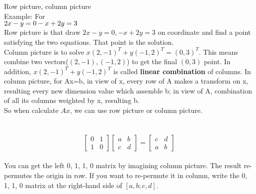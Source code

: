 \documentclass{article}
\begin{document}
\begin{spacing}{1.5}


\section{}
Row picture, column picture\\
Example: For\\
	$2x-y=0\\
	-x+2y=3$ \\
Row picture is that draw $2x-y=0, -x+2y=3$ on coordinate and find a point satisfying the two equations. That point is the solution.\\
Column picture is to solve $x(2, -1)^T + y(-1, 2)^T = (0, 3)^T$. This means combine two vectors($(2, -1), (-1, 2)$) to get the final $(0,3)$ point. In addition, $x(2, -1)^T + y(-1, 2)^T$ is called {\bfseries linear combination} of columns. In column picture, for Ax=b, in view of x, every row of A makes a transform on x, resulting every new dimension value which assemble b; in view of A, combination of all its columns weighted by x, resulting b. \\
So when calculate $Ax$, we can use row picture or column picture. 


\section{}
$$
\begin{bmatrix}
0 & 1 \\
1 & 0 
\end{bmatrix}
\begin{bmatrix}
a & b\\
c & d
\end{bmatrix}
=
\begin{bmatrix}
c & d \\
a & b
\end{bmatrix}
$$ \\
You can get the left 0, 1, 1, 0 matrix by imagining column picture.
The result re-permutes the origin in row. If you want to re-permute it in column, write the 0, 1, 1, 0 matrix at the right-hand side of $[a, b; c, d]$.



\end{spacing}
\end{document}
